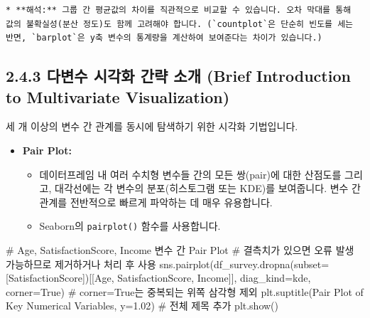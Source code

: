 \documentclass[
  letterpaper,
]{book}
\newenvironment{Shaded}{\begin{snugshade}}{\end{snugshade}}
\newcommand{\CommentTok}[1]{\textcolor[rgb]{0.37,0.37,0.37}{#1}}
\newcommand{\FloatTok}[1]{\textcolor[rgb]{0.68,0.00,0.00}{#1}}
\newcommand{\NormalTok}[1]{\textcolor[rgb]{0.00,0.23,0.31}{#1}}
\newcommand{\OperatorTok}[1]{\textcolor[rgb]{0.37,0.37,0.37}{#1}}
\newcommand{\StringTok}[1]{\textcolor[rgb]{0.13,0.47,0.30}{#1}}
\newcommand{\VariableTok}[1]{\textcolor[rgb]{0.07,0.07,0.07}{#1}}
\providecommand{\tightlist}{%
  \setlength{\itemsep}{0pt}\setlength{\parskip}{0pt}}
\begin{document}
\begin{verbatim}
* **해석:** 그룹 간 평균값의 차이를 직관적으로 비교할 수 있습니다. 오차 막대를 통해 값의 불확실성(분산 정도)도 함께 고려해야 합니다. (`countplot`은 단순히 빈도를 세는 반면, `barplot`은 y축 변수의 통계량을 계산하여 보여준다는 차이가 있습니다.)
\end{verbatim}

\subsection{2.4.3 다변수 시각화 간략 소개 (Brief Introduction to
Multivariate
Visualization)}\label{uxb2e4uxbcc0uxc218-uxc2dcuxac01uxd654-uxac04uxb7b5-uxc18cuxac1c-brief-introduction-to-multivariate-visualization}

세 개 이상의 변수 간 관계를 동시에 탐색하기 위한 시각화 기법입니다.

\begin{itemize}
\tightlist
\item
  \textbf{Pair Plot:}

  \begin{itemize}
  \tightlist
  \item
    데이터프레임 내 여러 수치형 변수들 간의 모든 쌍(pair)에 대한
    산점도를 그리고, 대각선에는 각 변수의 분포(히스토그램 또는 KDE)를
    보여줍니다. 변수 간 관계를 전반적으로 빠르게 파악하는 데 매우
    유용합니다.
  \item
    Seaborn의 \texttt{pairplot()} 함수를 사용합니다.
  \end{itemize}
\end{itemize}

\begin{Shaded}
\begin{Highlighting}[]
\CommentTok{\# Age, SatisfactionScore, Income 변수 간 Pair Plot}
\CommentTok{\# 결측치가 있으면 오류 발생 가능하므로 제거하거나 처리 후 사용}
\NormalTok{sns.pairplot(df\_survey.dropna(subset}\OperatorTok{=}\NormalTok{[}\StringTok{\textquotesingle{}SatisfactionScore\textquotesingle{}}\NormalTok{])[[}\StringTok{\textquotesingle{}Age\textquotesingle{}}\NormalTok{, }\StringTok{\textquotesingle{}SatisfactionScore\textquotesingle{}}\NormalTok{, }\StringTok{\textquotesingle{}Income\textquotesingle{}}\NormalTok{]], diag\_kind}\OperatorTok{=}\StringTok{\textquotesingle{}kde\textquotesingle{}}\NormalTok{, corner}\OperatorTok{=}\VariableTok{True}\NormalTok{) }\CommentTok{\# corner=True는 중복되는 위쪽 삼각형 제외}
\NormalTok{plt.suptitle(}\StringTok{\textquotesingle{}Pair Plot of Key Numerical Variables\textquotesingle{}}\NormalTok{, y}\OperatorTok{=}\FloatTok{1.02}\NormalTok{) }\CommentTok{\# 전체 제목 추가}
\NormalTok{plt.show()}
\end{Highlighting}
\end{Shaded}
\end{document}
